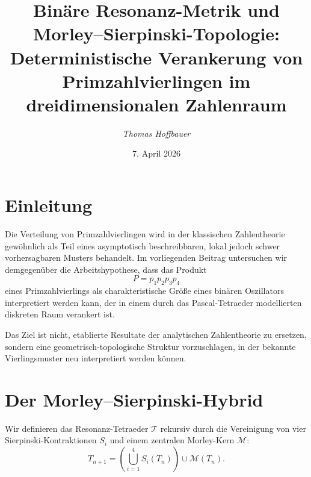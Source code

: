 \documentclass[11pt,a4paper,twocolumn]{article}
\title{\textbf{Binäre Resonanz-Metrik und Morley--Sierpinski-Topologie:\\
		Deterministische Verankerung von Primzahlvierlingen im dreidimensionalen Zahlenraum}}
\author{\textit{Thomas Hoffbauer}}
\date{7. April 2026}
\theoremstyle{definition}
\theoremstyle{remark}
\begin{document}
	
	
	\section{Einleitung}
	Die Verteilung von Primzahlvierlingen wird in der klassischen Zahlentheorie
	gewöhnlich als Teil eines asymptotisch beschreibbaren, lokal jedoch schwer
	vorhersagbaren Musters behandelt. Im vorliegenden Beitrag untersuchen wir
	demgegenüber die Arbeitshypothese, dass das Produkt
	\[
	P = p_1 p_2 p_3 p_4
	\]
	eines Primzahlvierlings als charakteristische Größe eines binären Oszillators
	interpretiert werden kann, der in einem durch das Pascal-Tetraeder modellierten
	diskreten Raum verankert ist.
	
	Das Ziel ist nicht, etablierte Resultate der analytischen Zahlentheorie zu ersetzen,
	sondern eine geometrisch-topologische Struktur vorzuschlagen, in der bekannte
	Vierlingsmuster neu interpretiert werden können.
	
	\section{Der Morley--Sierpinski-Hybrid}
	Wir definieren das Resonanz-Tetraeder $\mathcal{T}$ rekursiv durch die Vereinigung
	von vier Sierpinski-Kontraktionen $S_i$ und einem zentralen Morley-Kern
	$\mathcal{M}$:
	\begin{equation}
		T_{n+1}
		=
		\left(
		\bigcup_{i=1}^{4} S_i(T_n)
		\right)
		\cup
		\mathcal{M}(T_n).
	\end{equation}
	
\end{document}
